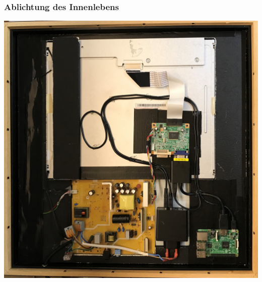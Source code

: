 \documentclass[11pt]{beamer}
\begin{document}
	\begin{frame}
		\frametitle{Ablichtung des Innenlebens}
		\begin{center}
			\includegraphics[scale= 0.07]{images/20170624_114852514_iOS.jpg}		
		\end{center}
	\end{frame}
\end{document}
